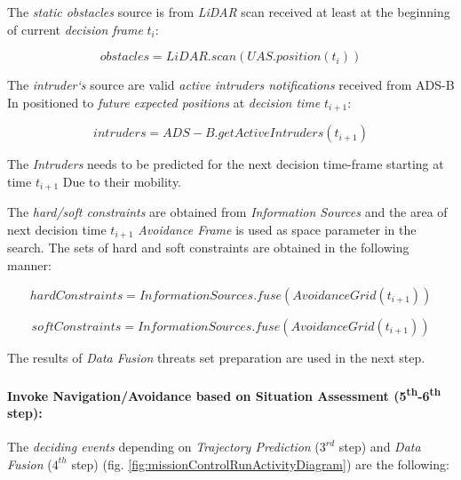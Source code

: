 The \emph{static obstacles} source is from \emph{LiDAR} scan received at least at the  beginning of current \emph{decision frame} $t_i$:

\begin{equation*}
        obstacles=LiDAR.scan(UAS.position(t_i))
\end{equation*}

The \emph{intruder`s} source are valid \emph{active intruders notifications} received from ADS-B In positioned to \emph{future expected positions} at \emph{decision time} $t_{i+1}$:

\begin{equation*}
        intruders=ADS-B.get Active Intruders(t_{i+1})
\end{equation*}

\begin{note}
    The \emph{Intruders} needs to be predicted for the next decision time-frame starting at time $t_{i+1}$ Due to their mobility.
\end{note}

\noindent The \emph{hard/soft constraints} are obtained from \emph{Information Sources} and the area of next decision time $t_{i+1}$ \emph{Avoidance Frame} is used as space parameter in the search. The sets of hard and soft constraints are obtained in the following manner:

\begin{equation*}
    hard Constraints= Information Sources.fuse(Avoidance Grid(t_{i+1}))
\end{equation*}

\begin{equation*}        
        soft Constraints=Information Sources.fuse(Avoidance Grid(t_{i+1}))
\end{equation*}

\noindent The results of \emph{Data Fusion} threats set preparation are used in the next step.


\paragraph{Invoke Navigation/Avoidance based on Situation Assessment (5\textsuperscript{th}-6\textsuperscript{th} step):} The \emph{deciding events} depending on \emph{Trajectory Prediction} ($3^{rd}$ step) and \emph{Data Fusion} ($4^{th}$ step) (fig. \ref{fig:missionControlRunActivityDiagram}) are the following:

